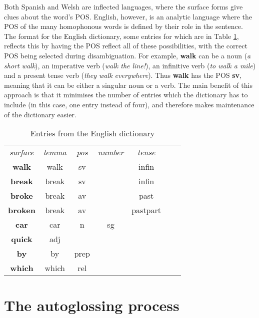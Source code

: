 \documentclass[11pt]{article}
\begin{document}
Both Spanish and Welsh are inflected languages, where the surface forms give clues about the word's POS.  English, however, is an analytic language where the POS of the many homophonous words is defined by their role in the sentence.  The format for the English dictionary, some entries for which are in Table \ref{english_dict}, reflects this by having the POS reflect all of these possibilities, with the correct POS being selected during disambiguation.  For example, \textbf{walk} can be a noun (\textit{a short walk}), an imperative verb (\textit{walk the line!}), an infinitive verb (\textit{to walk a mile}) and a present tense verb (\textit{they walk everywhere}).  Thus \textbf{walk} has the POS \textbf{sv}, meaning that it can be either a singular noun or a verb. The main benefit of this approach is that it minimises the number of entries which the dictionary has to include (in this case, one entry instead of four), and therefore makes maintenance of the dictionary easier.

\begin{table}[!hbtp]
\centering
\begin{scriptsize}
\begin{tabular}{ccccccc}
\textit{surface} & \textit{lemma} & \textit{pos} & \textit{number} & \textit{tense} \\
\textbf{walk} & walk & sv & & infin \\
\textbf{break} & break & sv & & infin \\
\textbf{broke} & break & av & & past \\
\textbf{broken} & break & av & & pastpart \\
\textbf{car} & car & n & sg & \\
\textbf{quick} & adj & & & \\
\textbf{by} & by & prep & & \\
\textbf{which} & which & rel & & \\
\end{tabular}
\end{scriptsize}
\caption{Entries from the English dictionary}
\label{english_dict}
\end{table}


\section{The autoglossing process}
\label{sec:autoglosser}
\end{document}
